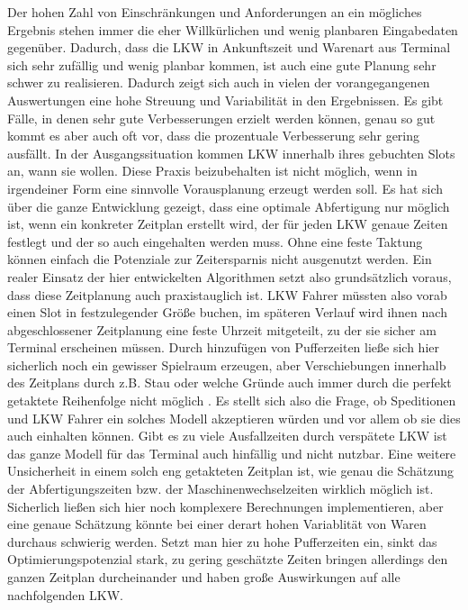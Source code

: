 Der hohen Zahl von Einschränkungen und Anforderungen an ein mögliches Ergebnis stehen immer die eher Willkürlichen und wenig planbaren Eingabedaten gegenüber. Dadurch, dass die LKW in Ankunftszeit und Warenart aus Terminal sich sehr zufällig und wenig planbar kommen, ist auch eine gute Planung sehr schwer zu realisieren. Dadurch zeigt sich auch in vielen der vorangegangenen Auswertungen eine hohe Streuung und Variabilität in den Ergebnissen. Es gibt Fälle, in denen sehr gute Verbesserungen erzielt werden können, genau so gut kommt es aber auch oft vor, dass die prozentuale Verbesserung sehr gering ausfällt. In der Ausgangssituation kommen LKW innerhalb ihres gebuchten Slots an, wann sie wollen. Diese Praxis beizubehalten ist nicht möglich, wenn in irgendeiner Form eine sinnvolle Vorausplanung erzeugt werden soll. Es hat sich über die ganze Entwicklung gezeigt, dass eine optimale Abfertigung nur möglich ist, wenn ein konkreter Zeitplan erstellt wird, der für jeden LKW genaue Zeiten festlegt und der so auch eingehalten werden muss. Ohne eine feste Taktung können einfach die Potenziale zur Zeitersparnis nicht ausgenutzt werden. Ein realer Einsatz der hier entwickelten Algorithmen setzt also grundsätzlich voraus, dass diese Zeitplanung auch praxistauglich ist. LKW Fahrer müssten also vorab einen Slot in festzulegender Größe buchen, im späteren Verlauf wird ihnen nach abgeschlossener Zeitplanung eine feste Uhrzeit mitgeteilt, zu der sie sicher am Terminal erscheinen müssen. Durch hinzufügen von Pufferzeiten ließe sich hier sicherlich noch ein gewisser Spielraum erzeugen, aber Verschiebungen innerhalb des Zeitplans durch z.B. Stau oder welche Gründe auch immer durch die perfekt getaktete Reihenfolge nicht möglich . Es stellt sich also die Frage, ob Speditionen und LKW Fahrer ein solches Modell akzeptieren würden und vor allem ob sie dies auch einhalten können. Gibt es zu viele Ausfallzeiten durch verspätete LKW ist das ganze Modell für das Terminal auch hinfällig und nicht 
nutzbar. Eine weitere Unsicherheit in einem solch eng getakteten Zeitplan ist, wie genau die Schätzung der Abfertigungszeiten bzw. der Maschinenwechselzeiten wirklich möglich ist. Sicherlich ließen sich hier noch komplexere Berechnungen implementieren, aber eine genaue Schätzung könnte bei einer derart hohen Variablität von Waren durchaus schwierig werden. Setzt man hier zu hohe Pufferzeiten ein, sinkt das Optimierungspotenzial stark, zu gering geschätzte Zeiten bringen allerdings den ganzen Zeitplan durcheinander und haben große Auswirkungen auf alle nachfolgenden LKW. 





